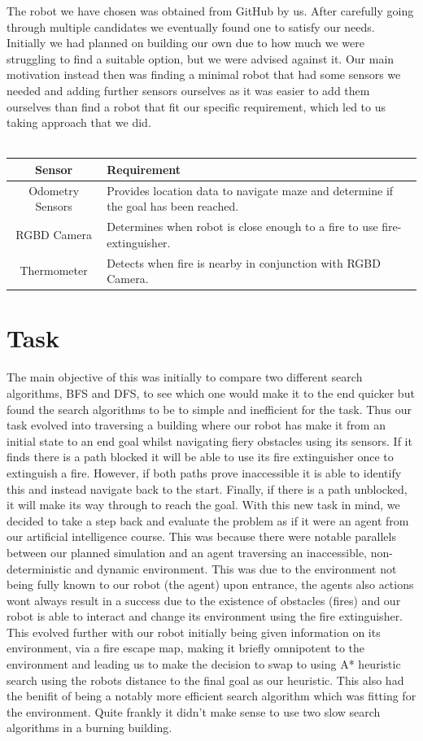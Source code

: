 \documentclass[12pt,a4paper,twoside]{article}
\begin{document}
The robot we have chosen was obtained from GitHub by us. \cite{robot} 
After carefully going through multiple candidates we eventually 
found one to satisfy our needs. Initially we had planned on 
building our own due to how much we were struggling to 
find a suitable option, but we were advised against it. 
Our main motivation instead then was finding a minimal robot that had some sensors 
we needed and adding further sensors ourselves as it was easier to add them 
ourselves than find a robot that fit our specific requirement,
which led to us taking approach that we did.\\\\
\begin{tabular}{|c | p{4.5cm} |} 
\hline
 Sensor & Requirement \\
 \hline
Odometry Sensors & Provides location data to navigate maze and determine if the goal has been reached. \\ 
 \hline
 RGBD Camera & Determines when robot is close enough to a fire to use fire-extinguisher.  \\
  \hline
 Thermometer & Detects when fire is nearby in conjunction with RGBD Camera.  \\
   \hline
\end{tabular}

\section{Task}

The main objective of this was initially to compare two 
different search algorithms, BFS and DFS, to see which 
one would make it to the end quicker but found the search 
algorithms to be to simple and inefficient for the task. 
Thus our task evolved into traversing a building where our robot has make 
it from an initial state to an end goal whilst navigating fiery obstacles using its sensors. 
If it finds there is a path blocked it will be able to use its fire extinguisher once to extinguish a fire. 
However, if both paths prove inaccessible it is able to identify this and instead navigate back to the start. 
Finally, if there is a path unblocked, it will make its way through 
to reach the goal.
With this new task in mind, we decided to take a step back and evaluate the problem as if it were an agent from our artificial intelligence course.
This was because there were notable parallels between our planned simulation and an agent traversing an inaccessible, non-deterministic and dynamic environment. 
This was due to the environment not being fully known to our robot (the agent) upon entrance, the agents also actions wont always result in a success due to the existence of obstacles (fires) and our robot is able to interact and change its environment using the fire extinguisher. This evolved further with our robot initially being given information on its environment, via a fire escape map, making it briefly omnipotent to the environment and leading us to make the decision to swap to using A* heuristic search using the robots distance to the final goal as our heuristic. This also had the benifit of being a notably more efficient search algorithm which was fitting for the environment. Quite frankly it didn't make sense to use two slow search algorithms in a burning building. 
\end{document}
